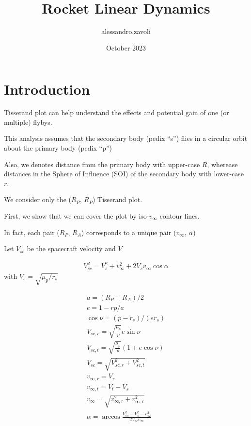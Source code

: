 \documentclass{article}
\title{Rocket Linear Dynamics}
\author{alessandro.zavoli }
\date{October 2023}
\newcommand{\vinf}{v_\infty}
\begin{document}
\maketitle


\section{Introduction}

Tisserand plot can help understand the effects and potential gain of one (or multiple) flybys.

This analysis assumes that the secondary body (pedix ``s'') flies in a circular orbit about the primary body (pedix ``p'')

Also, we denotes distance from the primary body with upper-case  $R$, wherease distances in the Sphere of Influence (SOI) of the secondary body with lower-case $r$.



We consider only the ($R_P$, $R_P$) Tisserand plot.



First, we show that we can cover the plot by iso-$v_\infty$ contour lines.


In fact, each pair ($R_P$, $R_A$) corresponds to a unique pair ($\vinf$, $\alpha$)



Let $V_{sc}$ be the spacecraft velocity and $V$


\begin{align}
    V_{sc}^2 = V_s^2 + \vinf^2 + 2 V_s \vinf \cos\alpha
\end{align}
with $V_s = \sqrt{\mu_p/r_s}$

\begin{align}
    a = (R_P + R_A)/2 \\
    e = 1- rp/a \\
    \cos\nu = (p-r_s)/(e r_s) \\
%
    V_{sc,r} = \sqrt{\frac{\mu_p}{p}} e \sin\nu \\
    V_{sc,t} = \sqrt{\frac{\mu_p}{p}} (1+e\cos\nu) \\
    V_{sc} = \sqrt{V_{sc,r}^2+V_{sc,t}^2}
    \\
    v_{\infty,r} = V_r \\
    v_{\infty,t} = V_t - V_s \\
    \vinf = \sqrt{v_{\infty,r}^2+v_{\infty,t}^2} \\
    \alpha = \arccos\frac{V_{sc}^2-V_s^2-\vinf^2}{2V_{sc}\vinf}
\end{align}
\end{document}
